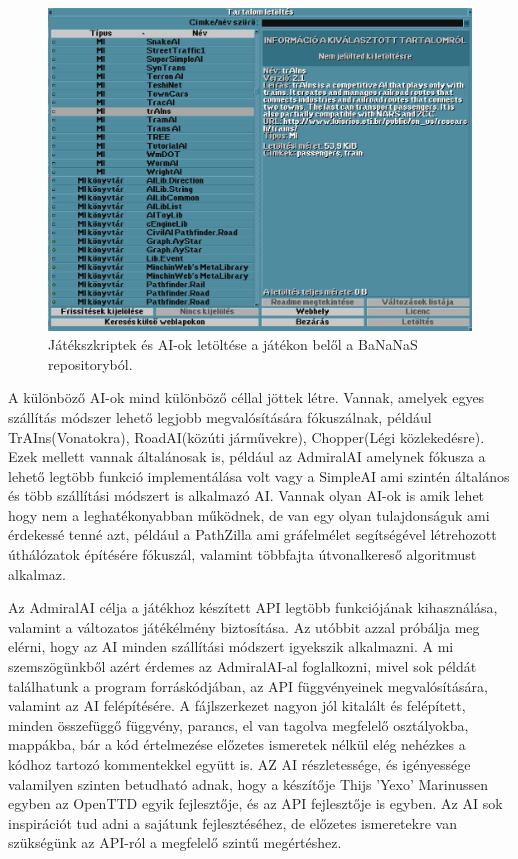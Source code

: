 \begin{figure}
	\centering
	\includegraphics[scale=0.4]{images/bananas.png}
	\caption{Játékszkriptek és AI-ok letöltése a játékon belől a BaNaNaS repositoryból.}
	\label{fig:bananas}
\end{figure}

A különböző AI-ok mind különböző céllal jöttek létre. Vannak, amelyek egyes szállítás módszer lehető legjobb megvalósítására fókuszálnak, például TrAIns(Vonatokra), RoadAI(közúti járművekre), Chopper(Légi közlekedésre). Ezek mellett vannak általánosak is, például az AdmiralAI amelynek fókusza a lehető legtöbb funkció implementálása volt vagy a SimpleAI ami szintén általános és több szállítási módszert is alkalmazó AI. Vannak olyan AI-ok is amik lehet hogy nem a leghatékonyabban működnek, de van egy olyan tulajdonságuk ami érdekessé tenné azt, például a PathZilla ami gráfelmélet segítségével létrehozott úthálózatok építésére fókuszál, valamint többfajta útvonalkereső algoritmust alkalmaz.

Az AdmiralAI célja a játékhoz készített API legtöbb funkciójának kihasználása, valamint a változatos játékélmény biztosítása. Az utóbbit azzal próbálja meg elérni, hogy az AI minden szállítási módszert igyekszik alkalmazni. A mi szemszögünkből azért érdemes az AdmiralAI-al foglalkozni, mivel sok példát találhatunk a program forráskódjában, az API függvényeinek megvalósítására, valamint az AI felépítésére. A fájlszerkezet nagyon jól kitalált és felépített, minden összefüggő függvény, parancs, el van tagolva megfelelő osztályokba, mappákba, bár a kód értelmezése előzetes ismeretek nélkül elég nehézkes a kódhoz tartozó kommentekkel együtt is. AZ AI részletessége, és igényessége valamilyen szinten betudható adnak, hogy a készítője Thijs 'Yexo' Marinussen egyben az OpenTTD egyik fejlesztője, és az API fejlesztője is egyben. Az AI sok inspirációt tud adni a sajátunk fejlesztéséhez, de előzetes ismeretekre van szükségünk az API-ról a megfelelő szintű megértéshez.

